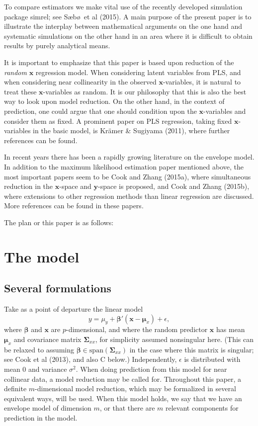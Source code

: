 \documentclass[11pt]{article}
\begin{document}
To compare estimators we make vital use of the recently developed simulation package simrel; see S\ae b\o \ et al (2015). A main purpose of the present paper is to illustrate the interplay between mathematical arguments on the one hand and systematic simulations on the other hand in an area where it is difficult to obtain results by purely analytical means.

It is important to emphasize that this paper is based upon reduction of the \emph{random} $\bm{x}$ regression model. When considering latent variables from PLS, and when considering near collinearity in the observed $\bm{x}$-variables, it is natural to treat these $\bm{x}$-variables as random. It is our philosophy that this is also the best way to look upon model reduction. On the other hand, in the context of prediction, one could argue that one should condition upon the $\bm{x}$-variables and consider them as fixed. A prominent paper on PLS regression, taking fixed $\bm{x}$-variables in the basic model, is Kr\"{a}mer \& Sugiyama (2011), where further references can be found. 

In recent years there has been a rapidly growing literature on the envelope model. In addition to the maximum likelihood estimation paper mentioned above, the most important papers seem to be Cook and Zhang (2015a), where simultaneous reduction in the $\bm{x}$-space and $\bm{y}$-space is proposed, and Cook and Zhang (2015b), where extensions to other regression methods than linear regression are discussed. More references can be found in these papers.

The plan or this paper is as follows:

\section{The model}

\subsection{Several formulations}

Take as a point of departure the linear model
\begin{equation}\label{model}
y=\mu_{y}+\bm{\beta}'(\bm{x}-\bm{\mu}_{x})+\epsilon,
\end{equation}
where $\bm{\beta}$ and $\bm{x}$ are $p$-dimensional, and where the random predictor $\bm{x}$ has mean $\bm{\mu}_{x}$ and covariance matrix 
$\bm{\Sigma}_{xx}$, for simplicity assumed nonsingular here. (This can be relaxed to assuming $\bm{\beta}\in\mathrm{span}(\bm{\Sigma}_{xx})$ in the case where this matrix is singular; see Cook et al (2013), and also C below.) Independently, $\epsilon$ is distributed with mean 
$0$ and variance $\sigma^2$. When doing prediction from this model for near collinear data, a model reduction may be called for. Throughout 
this paper, a definite $m$-dimensional model reduction, which may be formalized in several equivalent ways, will be used. When this model holds, we say that 
we have an envelope model of dimension $m$, or that there are $m$ relevant components for prediction in the model.
\smallskip
\end{document}
